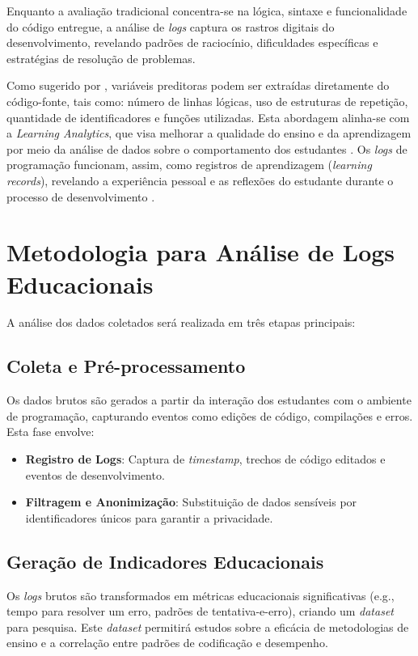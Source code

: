 Enquanto a avaliação tradicional concentra-se na lógica, sintaxe e funcionalidade do código entregue, a análise de \textit{logs} captura os rastros digitais do desenvolvimento, revelando padrões de raciocínio, dificuldades específicas e estratégias de resolução de problemas.

Como sugerido por \cite{silva2022previsao}, variáveis preditoras podem ser extraídas diretamente do código-fonte, tais como: número de linhas lógicas, uso de estruturas de repetição, quantidade de identificadores e funções utilizadas. Esta abordagem alinha-se com a \textit{Learning Analytics}, que visa melhorar a qualidade do ensino e da aprendizagem por meio da análise de dados sobre o comportamento dos estudantes \cite{huang2020predicting}. Os \textit{logs} de programação funcionam, assim, como registros de aprendizagem (\textit{learning records}), revelando a experiência pessoal e as reflexões do estudante durante o processo de desenvolvimento \cite{du2005learning}.
\section{Metodologia para Análise de Logs Educacionais}
\label{sec:metodologia-analise}

A análise dos dados coletados será realizada em três etapas principais:

\subsection{Coleta e Pré-processamento}
Os dados brutos são gerados a partir da interação dos estudantes com o ambiente de programação, capturando eventos como edições de código, compilações e erros. Esta fase envolve:
\begin{itemize}
    \item \textbf{Registro de Logs}: Captura de \textit{timestamp}, trechos de código editados e eventos de desenvolvimento.
    \item \textbf{Filtragem e Anonimização}: Substituição de dados sensíveis por identificadores únicos para garantir a privacidade.
\end{itemize}

\subsection{Geração de Indicadores Educacionais}
Os \textit{logs} brutos são transformados em métricas educacionais significativas (e.g., tempo para resolver um erro, padrões de tentativa-e-erro), criando um \textit{dataset} para pesquisa. Este \textit{dataset} permitirá estudos sobre a eficácia de metodologias de ensino e a correlação entre padrões de codificação e desempenho.


